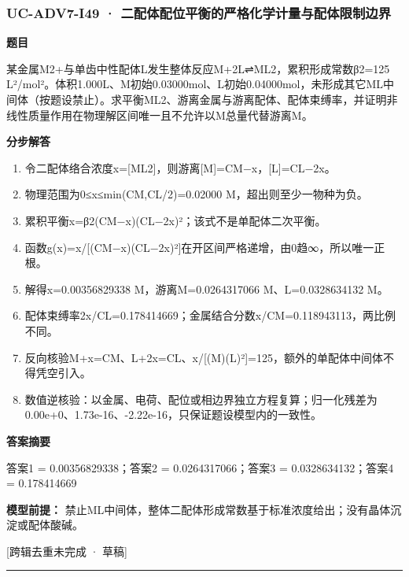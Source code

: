 \documentclass[UTF8,11pt,a4paper]{ctexart}
\begin{document}
\subsubsection*{UC-ADV7-I49 · 二配体配位平衡的严格化学计量与配体限制边界}
\noindent\textbf{题目}\par
某金属M2+与单齿中性配体L发生整体反应M+2L⇌ML2，累积形成常数β2=125 L²/mol²。体积1.000L、M初始0.03000mol、L初始0.04000mol，未形成其它ML中间体（按题设禁止）。求平衡ML2、游离金属与游离配体、配体束缚率，并证明非线性质量作用在物理解区间唯一且不允许以M总量代替游离M。\par
\medskip\noindent\textbf{分步解答}
\begin{enumerate}
\item 令二配体络合浓度x=[ML2]，则游离[M]=CM−x，[L]=CL−2x。
\item 物理范围为0≤x≤min(CM,CL/2)=0.02000 M，超出则至少一物种为负。
\item 累积平衡x=β2(CM−x)(CL−2x)²；该式不是单配体二次平衡。
\item 函数g(x)=x/[(CM−x)(CL−2x)²]在开区间严格递增，由0趋∞，所以唯一正根。
\item 解得x=0.00356829338 M，游离M=0.0264317066 M、L=0.0328634132 M。
\item 配体束缚率2x/CL=0.178414669；金属结合分数x/CM=0.118943113，两比例不同。
\item 反向核验M+x=CM、L+2x=CL、x/[(M)(L)²]=125，额外的单配体中间体不得凭空引入。
\item 数值逆核验：以金属、电荷、配位或相边界独立方程复算；归一化残差为0.00e+0、1.73e-16、-2.22e-16，只保证题设模型内的一致性。
\end{enumerate}
\noindent\textbf{答案摘要}\par
答案1 = 0.00356829338；答案2 = 0.0264317066；答案3 = 0.0328634132；答案4 = 0.178414669\par
\noindent\textbf{模型前提：}
禁止ML中间体，整体二配体形成常数基于标准浓度给出；没有晶体沉淀或配体酸碱。\par
\noindent\textcolor{red!65!black}{[跨辑去重未完成 · 草稿]} \par
\medskip\hrule\medskip
{}
\end{document}
